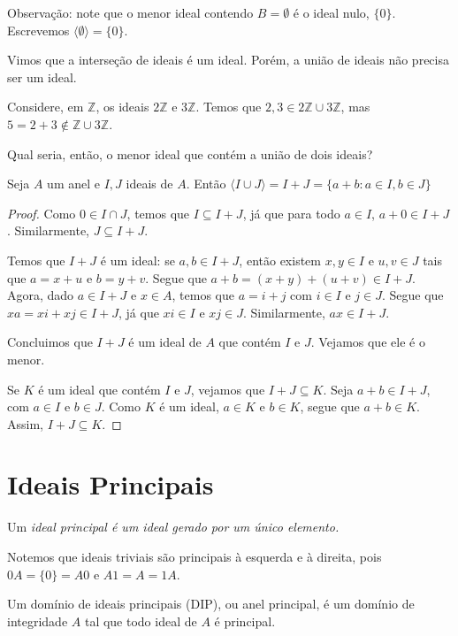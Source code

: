 Observação: note que o menor ideal contendo $B=\emptyset$ é o ideal nulo, $\{0\}$.
Escrevemos $\langle \emptyset\rangle=\{0\}$.

Vimos que a interseção de ideais é um ideal. Porém, a união de ideais não precisa ser um ideal.

\begin{exemplo} Considere, em $\mathbb Z$, os ideais $2\mathbb Z$ e $3\mathbb Z$. Temos que $2, 3 \in 2\mathbb Z\cup 3\mathbb Z$, mas $5=2+3\notin \mathbb Z\cup 3\mathbb Z$.
\end{exemplo}

Qual seria, então, o menor ideal que contém a união de dois ideais?
\begin{prop}
    Seja $A$ um anel e $I, J$ ideais de $A$. Então $\langle I\cup J\rangle=I+J=\{a+b: a \in I, b \in J\}$
\end{prop}
\begin{proof}
Como $0\in I\cap J$, temos que $I\subseteq I+J$, já que para todo $a \in I$, $a+0\in I+J$.
Similarmente, $J\subseteq I+J$.

Temos que $I+J$ é um ideal: se $a, b \in I+J$, então existem $x, y \in I$ e $u, v \in J$ tais que $a=x+u$ e $b=y+v$.
Segue que $a+b=(x+y)+(u+v)\in I+J$.
Agora, dado $a \in I+J$ e $x \in A$, temos que $a=i+j$ com $i \in I$ e $j \in J$.
Segue que $xa=xi+xj\in I+J$, já que $xi \in I$ e $xj \in J$. 
Similarmente, $ax\in I+J$.

Concluimos que $I+J$ é um ideal de $A$ que contém $I$ e $J$. Vejamos que ele é o menor.

Se $K$ é um ideal que contém $I$ e $J$, vejamos que $I+J\subseteq K$.
Seja $a+b \in I+J$, com $a \in I$ e $b \in J$.
Como $K$ é um ideal, $a \in K$ e $b \in K$, segue que $a+b \in K$.
Assim, $I+J\subseteq K$.
\end{proof}
\section{Ideais Principais}
\begin{definition}
    Um \em{ideal principal} é um ideal gerado por um único elemento.
\end{definition}

Notemos que ideais triviais são principais à esquerda e à direita, pois $0A=\{0\}=A0$ e $A1=A=1A$.

\begin{definition}
    Um domínio de ideais principais (DIP), ou anel principal, é um domínio de integridade $A$ tal que todo ideal de $A$ é principal.
\end{definition}

